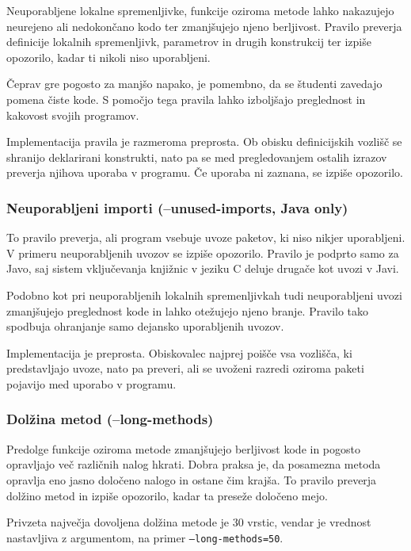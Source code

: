 \documentclass[a4paper,12pt,openright]{book}
\begin{document}
Neuporabljene lokalne spremenljivke, funkcije oziroma metode lahko nakazujejo neurejeno ali nedokončano kodo ter zmanjšujejo njeno berljivost. Pravilo preverja definicije lokalnih spremenljivk, parametrov in drugih konstrukcij ter izpiše opozorilo, kadar ti nikoli niso uporabljeni.

Čeprav gre pogosto za manjšo napako, je pomembno, da se študenti zavedajo pomena čiste kode. S pomočjo tega pravila lahko izboljšajo preglednost in kakovost svojih programov.

Implementacija pravila je razmeroma preprosta. Ob obisku definicijskih vozlišč se shranijo deklarirani konstrukti, nato pa se med pregledovanjem ostalih izrazov preverja njihova uporaba v programu. Če uporaba ni zaznana, se izpiše opozorilo.

\subsubsection{Neuporabljeni importi (--unused-imports, Java only)}

To pravilo preverja, ali program vsebuje uvoze paketov, ki niso nikjer uporabljeni. V primeru neuporabljenih uvozov se izpiše opozorilo. Pravilo je podprto samo za Javo, saj sistem vključevanja knjižnic v jeziku C deluje drugače kot uvozi v Javi.

Podobno kot pri neuporabljenih lokalnih spremenljivkah tudi neuporabljeni uvozi zmanjšujejo preglednost kode in lahko otežujejo njeno branje. Pravilo tako spodbuja ohranjanje samo dejansko uporabljenih uvozov.

Implementacija je preprosta. Obiskovalec najprej poišče vsa vozlišča, ki predstavljajo uvoze, nato pa preveri, ali se uvoženi razredi oziroma paketi pojavijo med uporabo v programu.

\subsubsection{Dolžina metod (--long-methods)}

Predolge funkcije oziroma metode zmanjšujejo berljivost kode in pogosto opravljajo več različnih nalog hkrati. Dobra praksa je, da posamezna metoda opravlja eno jasno določeno nalogo in ostane čim krajša. To pravilo preverja dolžino metod in izpiše opozorilo, kadar ta preseže določeno mejo.

Privzeta največja dovoljena dolžina metode je 30 vrstic, vendar je vrednost nastavljiva z argumentom, na primer \texttt{--long-methods=50}.
\end{document}
